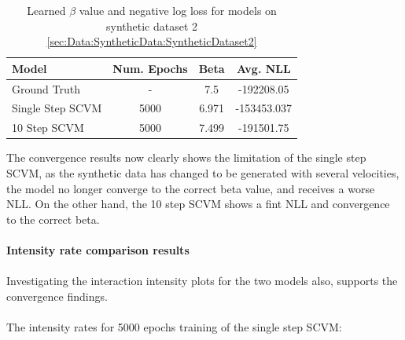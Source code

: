 \begin{table}[H]
\centering
\begin{tabular}{|l|c|cc|}
\hline
Model         & \multicolumn{1}{l|}{Num. Epochs} & Beta & Avg. NLL \\ \hline
Ground Truth  & -                                & 7.5  & -192208.05 \\
Single Step SCVM & 5000                          & 6.971 &  -153453.037      \\
10 Step SCVM & 5000                          & 7.499   & -191501.75      \\ \hline
\end{tabular}
\caption{Learned $\beta$ value and negative log loss for models on synthetic dataset 2 \ref{sec:Data:SyntheticData:SyntheticDataset2}}
\label{tab:MultiStep1}
\end{table}
\noindent 
The convergence results now clearly shows the limitation of the single step SCVM, as the synthetic data has changed to be generated with several velocities, the model no longer converge to the correct beta value, and receives a worse NLL. On the other hand, the 10 step SCVM shows a fint NLL and convergence to the correct beta.
\\\\
\textbf{Intensity rate comparison results}
\\\\
Investigating the interaction intensity plots for the two models also, supports the convergence findings.
\\\\
The intensity rates for 5000 epochs training of the single step SCVM:
